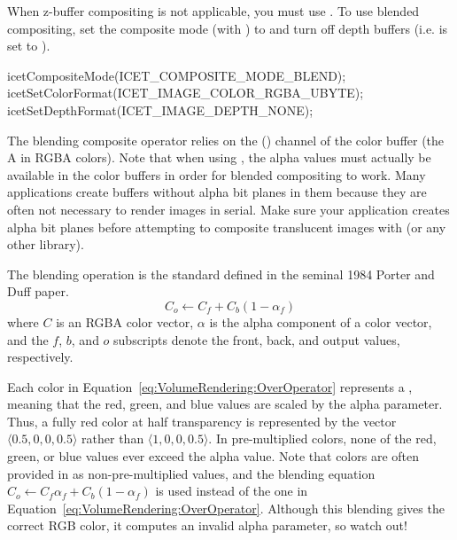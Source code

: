 When z-buffer compositing is not applicable, you must use .  To use blended compositing, set the composite mode (with
) to  and turn
off depth buffers (i.e.  is set to
).

\begin{code}
icetCompositeMode(ICET_COMPOSITE_MODE_BLEND);
icetSetColorFormat(ICET_IMAGE_COLOR_RGBA_UBYTE);
icetSetDepthFormat(ICET_IMAGE_DEPTH_NONE);
\end{code}

The blending composite operator relies on the 
(\index{$\alpha$}\keyterm{$\alpha$}) channel of the color buffer (the A in
RGBA colors).  Note that when using \OpenGL, the alpha values must actually
be available in the \OpenGL color buffers in order for blended compositing
to work.  Many applications create \OpenGL buffers without alpha bit planes
in them because they are often not necessary to render images in serial.
Make sure your application creates alpha bit planes before attempting to
composite translucent images with \IceT (or any other library).

The blending operation is the standard
defined in the seminal 1984 Porter and Duff paper.
\begin{equation}
  C_o \leftarrow C_f + C_b (1 - \alpha_f)
  \label{eq:VolumeRendering:OverOperator}
\end{equation}
where $C$ is an RGBA color vector, $\alpha$ is the alpha component of a
color vector, and the $f$, $b$, and $o$ subscripts denote the front, back,
and output values, respectively.

Each color in Equation~\ref{eq:VolumeRendering:OverOperator} represents a
, meaning that
the red, green, and blue values are scaled by the alpha parameter.  Thus, a
fully red color at half transparency is represented by the vector $\langle
0.5, 0, 0, 0.5 \rangle$ rather than $\langle 1, 0, 0, 0.5 \rangle$.  In
pre-multiplied colors, none of the red, green, or blue values ever exceed
the alpha value.  Note that colors are often provided in \OpenGL as
non-pre-multiplied values, and the blending equation $C_o \leftarrow C_f
\alpha_f + C_b (1 - \alpha_f)$ is used instead of the one in
Equation~\ref{eq:VolumeRendering:OverOperator}.  Although this blending
gives the correct RGB color, it computes an invalid alpha parameter, so
watch out!

